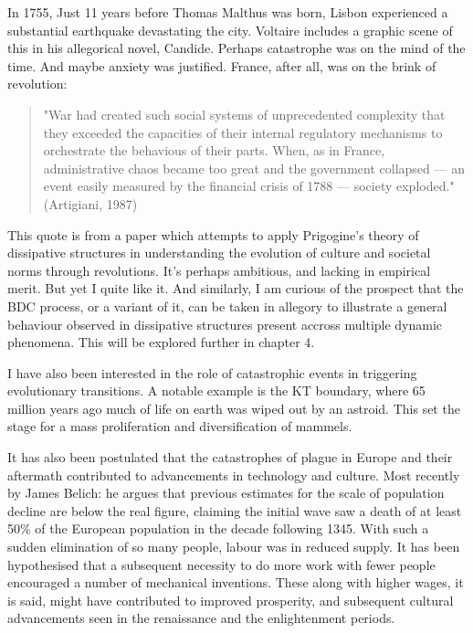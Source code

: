 In 1755, Just 11 years before Thomas Malthus was born, Lisbon experienced a substantial earthquake devastating the city.
Voltaire includes a graphic scene of this in his allegorical novel, Candide. Perhaps catastrophe was on the mind of the time.
And maybe anxiety was justified. France, after all, was on the brink of revolution: 

\begin{quotation}
"War had created such social systems of unprecedented complexity that they exceeded the capacities of their internal
regulatory mechanisms to orchestrate the behavious of their parts. When, as in France, administrative chaos became too 
great and the government collapsed --- an event easily measured by the financial crisis of 1788 --- society exploded." (Artigiani, 1987) \cite{artigiani1987revolution}
\end{quotation}    


This quote is from a paper which attempts to apply Prigogine's theory of dissipative structures in understanding the 
evolution of culture and societal norms through revolutions. It's perhaps ambitious, and lacking in empirical merit.
But yet I quite like it. And similarly, I am curious of the prospect that the BDC process, or a variant of it, can be taken 
in allegory to illustrate a general behaviour observed in dissipative structures present accross multiple dynamic
phenomena. This will be explored further in chapter 4.\par 

I have also been interested in the role of catastrophic events in triggering evolutionary transitions. A notable example
is the KT boundary, where 65 million years ago much of life on earth was wiped out by an astroid. This set the stage for a 
mass proliferation and diversification of mammels.\par

It has also been postulated that the catastrophes of plague in Europe and their aftermath contributed 
to advancements in technology and culture. Most recently by James Belich: he argues that previous estimates for the scale 
of population decline are below the real figure, claiming the initial wave saw a death of at least 50\% of the
European population in the decade following 1345. With such a sudden elimination of so many people, labour was in reduced
supply. It has been hypothesised that a subsequent necessity to do more work with fewer people encouraged a number of
mechanical inventions. These along with higher wages, it is said, might have contributed to improved prosperity, and 
subsequent cultural advancements seen in the renaissance and the enlightenment periods.\par

